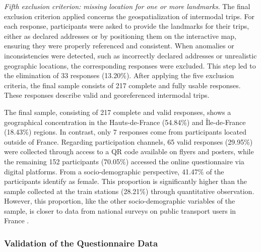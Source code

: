 \begin{refsegment}
\textsl{Fifth exclusion criterion: missing location for one or more landmarks}. The final exclusion criterion applied concerns the geospatialization of intermodal trips. For each response, participants were asked to provide the landmarks for their trips, either as declared addresses or by positioning them on the interactive map, ensuring they were properly referenced and consistent. When anomalies or inconsistencies were detected, such as incorrectly declared addresses or unrealistic geographic locations, the corresponding responses were excluded. This step led to the elimination of 33 responses (13.20\%). After applying the five exclusion criteria, the final sample consists of 217 complete and fully usable responses. These responses describe valid and georeferenced intermodal trips.%

The final sample, consisting of 217 complete and valid responses, shows a geographical concentration in the Hauts-de-France (54.84\%) and Île-de-France (18.43\%) regions. In contrast, only 7 responses come from participants located outside of France. Regarding participation channels, 65 valid responses (29.95\%) were collected through access to a QR code available on flyers and posters, while the remaining 152 participants (70.05\%) accessed the online questionnaire via digital platforms. From a socio-demographic perspective, 41.47\% of the participants identify as female. This proportion is significantly higher than the sample collected at the train stations (28.21\%) through quantitative observation. However, this proportion, like the other socio-demographic variables of the sample, is closer to data from national surveys on public transport users in France \textcolor{blue}{\autocite[]{enov_enquete_2021}}.%

\subsubsection*{Validation of the Questionnaire Data
    \label{chap3:administration-questionnaire-usagers-validation}
    }


\end{refsegment}
